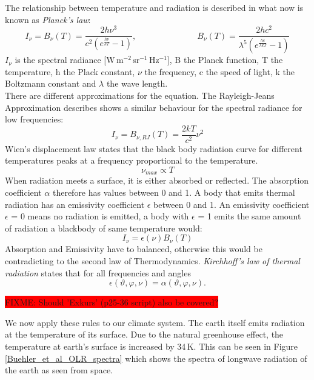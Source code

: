 The relationship between temperature and radiation is described in what now is known as \textit{Planck's law}:
\begin{equation}
I_{\nu} = B_{\nu}(T) = \frac{2h\nu^3}{c^2(e^{\frac{h\nu}{kT}}-1)}, 
               \hspace{3cm} B_{\nu}(T) = \frac{2hc^2}{\lambda^5(e^{\frac{hc}{\lambda kT}}-1)}
\end{equation}
$I_\nu$ is the spectral radiance [W\,m$^{-2}$\,sr$^{-1}$\,Hz$^{-1}$], B the Planck function, T the temperature, h the  Plack constant, $\nu$ the frequency, c the speed of light, k the Boltzmann constant and $\lambda$ the wave length.\\
There are different approximations for the equation. The Rayleigh-Jeans Approximation describes shows a similar behaviour for the spectral radiance for low frequencies:
\begin{equation}
I_{\nu} = B_{\nu, RJ}(T) = \frac{2kT}{c^2}\nu^2
\end{equation}
Wien's displacement law states that the black body radiation curve for different temperatures peaks at a frequency proportional to the temperature.
\begin{equation}
\nu_{max} \propto T
\end{equation}
When radiation meets a surface, it is either absorbed or reflected. The absorption coefficient $\alpha$ therefore has values between 0 and 1. A body that emits thermal radiation has an emissivity coefficient $\epsilon$ between 0 and 1. An emissivity coefficient $\epsilon$ = 0 means no radiation is emitted, a body with $\epsilon$ = 1 emits the same amount of radiation a blackbody of same temperature would:
\begin{equation}
I_\nu = \epsilon(\nu)B_\nu(T)
\end{equation}
Absorption and Emissivity have to balanced, otherwise this would be contradicting to the second law of Thermodynamics. \textit{Kirchhoff's law of thermal radiation} states that for all frequencies and angles 
\begin{equation}
\epsilon(\vartheta,\varphi,\nu) = \alpha(\vartheta,\varphi,\nu).
\end{equation}

\colorbox{red}{FIXME: Should 'Exkurs' (p25-36 script) also be covered?} \vspace{1cm}

We now apply these rules to our climate system. The earth itself emits radiation at the temperature of its surface. Due to the natural greenhouse effect, the temperature at earth's surface is increased by 34\,K. This can be seen in Figure \ref{Buehler_et_al_OLR_spectra} which shows the spectra of longwave radiation of the earth as seen from space.


